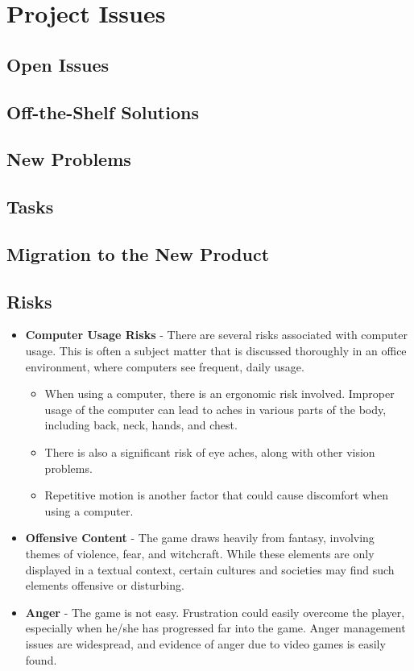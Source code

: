 \documentclass[12pt, titlepage]{article}
\begin{document}
\section{Project Issues}

	\subsection{Open Issues}

	\subsection{Off-the-Shelf Solutions}

	\subsection{New Problems}

	\subsection{Tasks}

	\subsection{Migration to the New Product}

	\subsection{Risks}

	\begin{itemize}
		\item \textbf{Computer Usage Risks} - There are several risks associated with computer usage. This is often a subject matter that is discussed thoroughly in an office environment, where computers see frequent, daily usage.
		\begin{itemize}
			\item When using a computer, there is an ergonomic risk involved. Improper usage of the computer can lead to aches in various parts of the body, including back, neck, hands, and chest.
			\item There is also a significant risk of eye aches, along with other vision problems.
			\item Repetitive motion is another factor that could cause discomfort when using a computer.
		\end{itemize}
		\item \textbf{Offensive Content} - The game draws heavily from fantasy, involving themes of violence, fear, and witchcraft. While these elements are only displayed in a textual context, certain cultures and societies may find such elements offensive or disturbing.
		\item \textbf{Anger} - The game is not easy. Frustration could easily overcome the player, especially when he/she has progressed far into the game. Anger management issues are widespread, and evidence of anger due to video games is easily found.
	\end{itemize}
\end{document}
